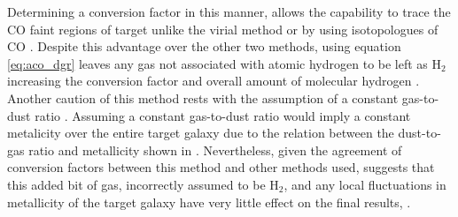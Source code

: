 Determining a conversion factor in this manner, allows the capability to trace the CO faint regions of target unlike the virial method or by using isotopologues of CO \citep{israel1997}.  Despite this advantage over the other two methods, using equation \ref{eq:aco_dgr} leaves any gas not associated with atomic hydrogen to be left as H$_2$ increasing the conversion factor and overall amount of molecular hydrogen \citep{bolatto2013}.  Another caution of this method rests with the assumption of a constant gas-to-dust ratio \citep{bolatto2013}.  Assuming a constant gas-to-dust ratio would imply a constant metalicity over the entire target galaxy due to the relation between the dust-to-gas ratio and metallicity shown in \cite{draine2007}.  Nevertheless, given the agreement of conversion factors between this method and other methods used, suggests that this added bit of gas, incorrectly assumed to be H$_2$, and any local fluctuations in metallicity of the target galaxy have very little effect on the final results, \citep{bolattor2013}.





